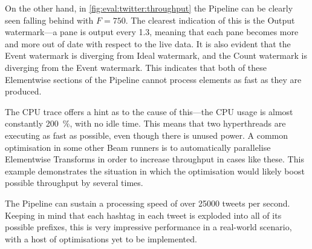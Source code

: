 On the other hand, in \cref{fig:eval:twitter:throughput} the Pipeline can be clearly seen falling behind with $F = 750$.
The clearest indication of this is the Output watermark---a pane is output every \SI{1.3}{\min}, meaning that each pane becomes more and more out of date with respect to the live data.
It is also evident that the Event watermark is diverging from Ideal watermark, and the Count watermark is diverging from the Event watermark.
This indicates that both of these Elementwise sections of the Pipeline cannot process elements as fast as they are produced.

The CPU trace offers a hint as to the cause of this---the CPU usage is almost constantly \SI{200}{\percent}, with no idle time.
This means that two hyperthreads are executing as fast as possible, even though there is unused power.
A common optimisation in some other Beam runners is to automatically parallelise Elementwise Transforms in order to increase throughput in cases like these.
This example demonstrates the situation in which the optimisation would likely boost possible throughput by several times.

The Pipeline can sustain a processing speed of over \num{25000} tweets per second.
Keeping in mind that each hashtag in each tweet is exploded into all of its possible prefixes, this is very impressive performance in a real-world scenario, with a host of optimisations yet to be implemented.

